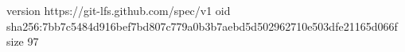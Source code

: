 version https://git-lfs.github.com/spec/v1
oid sha256:7bb7c5484d916bef7bd807c779a0b3b7aebd5d502962710e503dfe21165d066f
size 97
